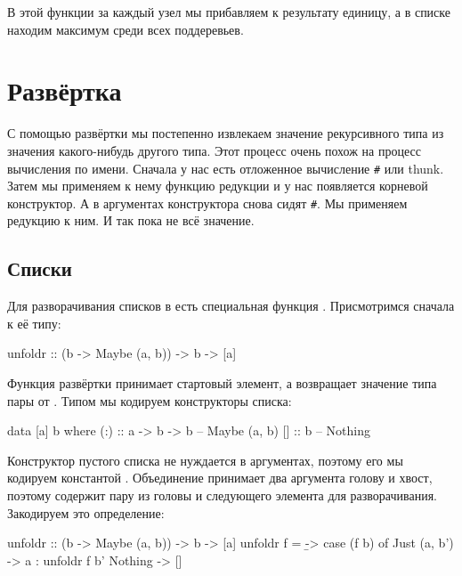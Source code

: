 
В этой функции за каждый узел мы прибавляем к результату
единицу, а в списке находим максимум среди всех поддеревьев. 

\section{Развёртка}

С помощью развёртки мы постепенно извлекаем значение
рекурсивного типа из значения какого-нибудь другого типа.
Этот процесс очень похож на процесс вычисления по имени.
Сначала у нас есть отложенное вычисление \verb!#! или thunk. 
Затем мы применяем к нему функцию редукции и у нас появляется 
корневой конструктор.
А в аргументах конструктора снова сидят \verb!#!. Мы применяем
редукцию к ним. И так пока не  всё значение.

\subsection{Списки}

Для разворачивания списков в  есть специальная
функция . Присмотримся сначала к её типу:

\begin{code}
unfoldr :: (b -> Maybe (a, b)) -> b -> [a]
\end{code}

Функция развёртки принимает стартовый элемент, а возвращает
значение типа пары от . Типом  мы кодируем 
конструкторы списка:

\begin{code}
data [a] b where
    (:)  :: a -> b -> b     -- Maybe (a, b)
    []   :: b               -- Nothing
\end{code}

Конструктор пустого списка не нуждается в аргументах, поэтому
его мы кодируем константой . Объединение принимает
два аргумента голову и хвост, поэтому  содержит пару
из головы и следующего элемента для разворачивания.
Закодируем это определение:

\begin{code}
unfoldr :: (b -> Maybe (a, b)) -> b -> [a]
unfoldr f = \b -> case (f b) of
    Just (a, b') -> a : unfoldr f b'
    Nothing      -> []
\end{code}


